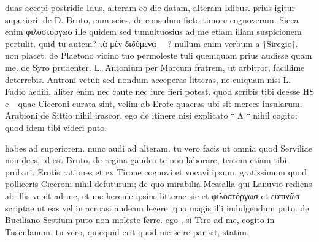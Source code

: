 


 duas accepi postridie Idus, alteram eo die datam, alteram Idibus. prius igitur superiori. de D. Bruto, cum scies. de consulum ficto timore cognoveram. Sicca enim φιλοστόργωσ ille quidem sed tumultuosius ad me etiam illam suspicionem pertulit. quid tu autem? τὰ μὲν διδόμενα —? nullum enim verbum a †Siregio†. non placet. de Plaetono vicino tuo permoleste tuli quemquam prius audisse quam me. de Syro prudenter. L. Antonium per Marcum fratrem, ut arbitror, facillime deterrebis. Antroni vetui; sed nondum acceperas litteras, ne cuiquam nisi L. Fadio aedili. aliter enim nec caute nec iure fieri potest. quod scribis tibi deesse HS c_ quae Ciceroni curata sint, velim ab Erote quaeras ubi sit merces insularum. Arabioni de Sittio nihil irascor. ego de itinere nisi explicato † Λ † nihil cogito; quod idem tibi videri puto.

 habes ad superiorem. nunc audi ad alteram. tu vero facis ut omnia quod Serviliae non dees, id est Bruto. de regina gaudeo te non laborare, testem etiam tibi probari. Erotis rationes et ex Tirone cognovi et vocavi ipsum. gratissimum quod polliceris Ciceroni nihil defuturum; de quo mirabilia Messalla qui Lanuvio rediens ab illis venit ad me, et me hercule ipsius litterae sic et φιλοστόργωσ et εὐπινῶσ scriptae ut eas vel in acroasi audeam legere. quo magis illi indulgendum puto. de Buciliano Sestium puto non moleste ferre. ego , si Tiro ad me, cogito in Tusculanum. tu vero, quicquid erit quod me scire par sit, statim.
